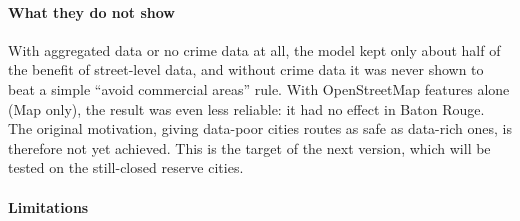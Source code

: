 \documentclass[preprint,12pt,authoryear]{elsarticle}
\begin{document}
\paragraph{What they do not show} With aggregated data or no crime data at all, the model kept only about half of the benefit of street-level data, and without crime data it was never shown to beat a simple ``avoid commercial areas'' rule. With OpenStreetMap features alone (Map only), the result was even less reliable: it had no effect in Baton Rouge. The original motivation, giving data-poor cities routes as safe as data-rich ones, is therefore not yet achieved. This is the target of the next version, which will be tested on the still-closed reserve cities.

\paragraph{Limitations}
\end{document}
